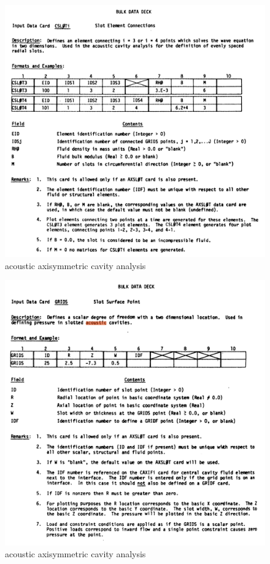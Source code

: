 \documentclass{article}
\begin{document}
\begin{figure}[h]
    \centering
\includegraphics[scale=0.35]{nastran_fig8}
    \caption{acoustic axisymmetric cavity analysis}
\end{figure}

\begin{figure}[h]
    \centering
\includegraphics[scale=0.35]{nastran_fig9}
    \caption{acoustic axisymmetric cavity analysis}
\end{figure}
\end{document}
